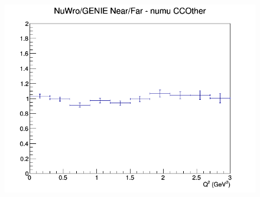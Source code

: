 \begin{figure}[h]
\endminipage
{}
\includegraphics[width=\linewidth]{eff_Q2/FGT/ratios/CCOther_NuWro_GENIE_numu_NF_Q2.png}
\endminipage
\newline
\end{figure}
\clearpage
